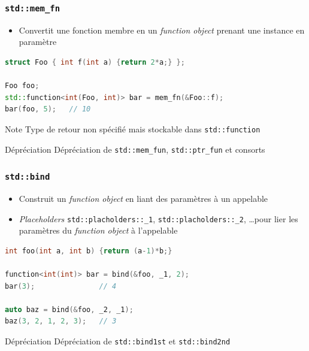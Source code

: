 \documentclass[C++.tex]{subfiles}
\begin{document}
\begin{frame}[fragile]
	\frametitle{\lstinline|std::mem_fn|}
	\begin{itemize}
		\item Convertit une fonction membre en un \textit{function object} prenant une instance en paramètre
	\end{itemize}

	\begin{lstlisting}[language=C++]
struct Foo { int f(int a) {return 2*a;} };

Foo foo;
std::function<int(Foo, int)> bar = mem_fn(&Foo::f);
bar(foo, 5);   // 10\end{lstlisting}

	\begin{block}{Note}
		Type de retour non spécifié mais stockable dans \lstinline|std::function|
	\end{block}

	\begin{block}{Dépréciation}
		Dépréciation de  \lstinline|std::mem_fun|, \lstinline|std::ptr_fun| et consorts

	\end{block}
\end{frame}

\begin{frame}[fragile]
	\frametitle{\lstinline|std::bind|}
	\begin{itemize}
		\item Construit un \textit{function object} en liant des paramètres à un appelable
		\item \textit{Placeholders} \lstinline|std::placholders::_1|, \lstinline|std::placholders::_2|, \ldots pour lier les paramètres du \textit{function object} à l'appelable
	\end{itemize}

	\begin{lstlisting}[language=C++]
int foo(int a, int b) {return (a-1)*b;}

function<int(int)> bar = bind(&foo, _1, 2);
bar(3);               // 4

auto baz = bind(&foo, _2, _1);
baz(3, 2, 1, 2, 3);   // 3\end{lstlisting}	


	\begin{block}{Dépréciation}
		Dépréciation de \lstinline|std::bind1st| et \lstinline|std::bind2nd|

	\end{block}
\end{frame}
\end{document}
